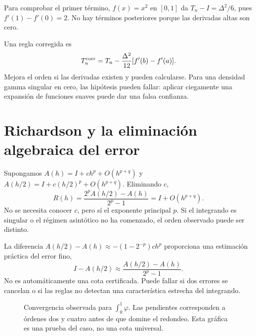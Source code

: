 \documentclass[11pt,a4paper]{article}
\theoremstyle{definition}
\begin{document}
Para comprobar el primer término, $f(x)=x^2$ en $[0,1]$ da
$T_n-I=\Delta^2/6$, pues $f'(1)-f'(0)=2$. No hay términos posteriores porque las derivadas altas son cero.

Una regla corregida es
\[
T_n^{\rm corr}=T_n-\frac{\Delta^2}{12}[f'(b)-f'(a)].
\]
Mejora el orden si las derivadas existen y pueden calcularse. Para una densidad gamma singular en cero, las hipótesis pueden fallar: aplicar ciegamente una expansión de funciones suaves puede dar una falsa confianza.

\section{Richardson y la eliminación algebraica del error}
Supongamos $A(h)=I+ch^p+O(h^{p+q})$ y $A(h/2)=I+c(h/2)^p+O(h^{p+q})$. Eliminando $c$,
\[
R(h)=\frac{2^pA(h/2)-A(h)}{2^p-1}
=I+O(h^{p+q}).
\]
No se necesita conocer $c$, pero sí el exponente principal $p$. Si el integrando es singular o el régimen asintótico no ha comenzado, el orden observado puede ser distinto.

La diferencia $A(h/2)-A(h)\approx-(1-2^{-p})ch^p$ proporciona una estimación práctica del error fino,
\[
I-A(h/2)\approx\frac{A(h/2)-A(h)}{2^p-1}.
\]
No es automáticamente una cota certificada. Puede fallar si dos errores se cancelan o si las reglas no detectan una característica estrecha del integrando.






\begin{figure}[htbp]\centering
{}
\caption{Convergencia observada para $\int_0^1\varphi$. Las pendientes corresponden a órdenes dos y cuatro antes de que domine el redondeo. Esta gráfica es una prueba del caso, no una cota universal.}\label{fig:cdf-5}\end{figure}
\end{document}
